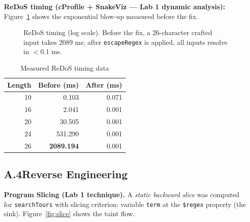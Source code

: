 \documentclass[11pt,a4paper]{article}
\begin{document}
\noindent\textbf{ReDoS timing (cProfile + SnakeViz --- Lab 1 dynamic analysis):}
Figure~\ref{fig:redos} shows the exponential blow-up measured before the fix.

\begin{figure}[H]
\centering
{}
\caption{ReDoS timing (log scale). Before the fix, a 26-character crafted input takes
  2089 ms; after \texttt{escapeRegex} is applied, all inputs resolve in $<$0.1 ms.}
\label{fig:redos}
\end{figure}

\begin{table}[H]
\centering\small
\begin{tabular}{@{}rrr@{}}
\toprule
\textbf{Length} & \textbf{Before (ms)} & \textbf{After (ms)} \\
\midrule
10 & 0.103 & 0.071 \\ 16 & 2.041 & 0.001 \\ 20 & 30.505 & 0.001 \\
24 & 531.290 & 0.001 \\ 26 & \textbf{2089.194} & 0.001 \\
\bottomrule
\end{tabular}
\caption{Measured ReDoS timing data}
\end{table}

\subsection{A.4\quad Reverse Engineering}

\noindent\textbf{Program Slicing (Lab 1 technique).}
A \emph{static backward slice} was computed for \texttt{searchTours} with slicing criterion:
variable \texttt{term} at the \texttt{\$regex} property (the sink).
Figure~\ref{fig:slice} shows the taint flow.
\end{document}
